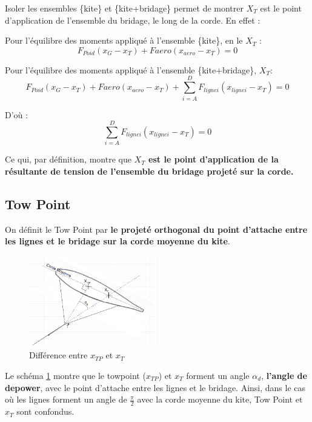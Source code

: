 Isoler les ensembles \{kite\} et \{kite+bridage\} permet de montrer $X_T$ est le point d'application de l'ensemble du bridage, le long de la corde. En effet :

Pour l'équilibre des moments appliqué à l'ensemble \{kite\}, en le $X_T$ :
\begin{equation}
    F_{Poid}(x_G-x_T)+F{aero}(x_{aero}-x_T) = 0
\end{equation}

Pour l'équilibre des moments appliqué à l'ensemble \{kite+bridage\}, $X_T$:
\begin{equation}
    F_{Poid}(x_G-x_T) + F{aero}(x_{aero}-x_T) + \sum_{i=A}^{D} F_{ligne i}(x_{ligne i}-x_T)= 0
\end{equation}

D'où : 
\begin{equation}
    \sum_{i=A}^{D} F_{ligne i}(x_{ligne i}-x_T)= 0
\end{equation}

Ce qui, par définition, montre que \textbf{$X_T$ est le point d'application de la résultante de tension de l'ensemble du bridage projeté sur la corde.}

\subsection{\textbf{Tow Point}} 
\label{subsec:Ch1.1.2}

On définit le Tow Point par \textbf{le projeté orthogonal du point d'attache entre les lignes et le bridage sur la corde moyenne du kite}. 

\begin{figure}[H]
    \centering
    \includegraphics[width=0.5\textwidth]{Pics/01 - xt et towpoint/xtp.png}  
    \caption{Différence entre $x_{TP}$ et $x_T$}
    \label{fig:Xtp}
\end{figure}

Le schéma \ref{fig:Xtp} montre que le towpoint ($x_{TP}$) et $x_T$ forment un angle $\alpha_d$, \textbf{l'angle de depower}, avec le point d'attache entre les lignes et le bridage. Ainsi, dans le cas où les lignes forment un angle de $\frac{\pi}{2}$ avec la corde moyenne du kite, Tow Point et $x_T$ sont confondus. 

